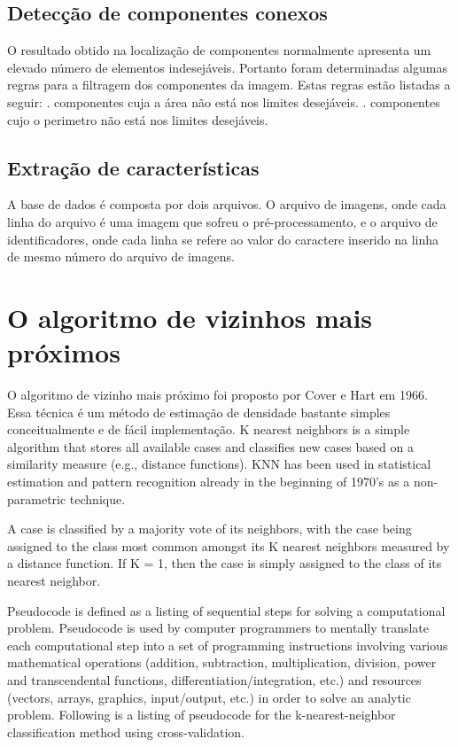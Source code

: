 \documentclass[
	article,			%
	11pt,				%
	oneside,			%
	a4paper,			%
	english,			%
	brazil,				%
	sumario=tradicional
	]{abntex2}
\begin{document}
\subsection{Detecção de componentes conexos}
      O resultado obtido na localização de componentes normalmente apresenta
um elevado número de elementos indesejáveis.
      Portanto foram determinadas algumas regras para a filtragem dos
componentes da imagem. Estas regras estão listadas a seguir:      . componentes cuja a área não está nos limites desejáveis. . componentes cujo o perimetro não está nos limites desejáveis.\newline



\subsection{Extração de características}

A base de dados é composta por dois arquivos. O arquivo de imagens, onde cada
linha do arquivo é uma imagem que sofreu o pré-processamento, e o arquivo de
identificadores, onde cada linha se refere ao valor do caractere inserido na
linha de mesmo número do arquivo de imagens.


\section{O algoritmo de vizinhos mais próximos}
O algoritmo de vizinho mais próximo foi proposto por Cover e Hart em 1966. Essa
técnica é um método de estimação de densidade bastante simples conceitualmente e
de fácil implementação.
K nearest neighbors is a simple algorithm that stores all available cases and
classifies new cases based on a similarity measure (e.g., distance functions).
KNN has been used in statistical estimation and pattern recognition already in
the beginning of 1970’s as a non-parametric technique.

A case is classified by a majority vote of its neighbors, with the case being
assigned to the class most common amongst its K nearest neighbors measured by a
distance function. If K = 1, then the case is simply assigned to the class of
its nearest neighbor.

Pseudocode is defined as a listing of sequential steps for solving a
computational problem. Pseudocode is used by computer programmers to mentally
translate each computational step into a set of programming instructions
involving various mathematical operations (addition, subtraction,
multiplication, division, power and transcendental functions,
differentiation/integration, etc.) and resources (vectors, arrays, graphics,
input/output, etc.) in order to solve an analytic problem. Following is a
listing of pseudocode for the k-nearest-neighbor classification method using
cross-validation.
\end{document}
